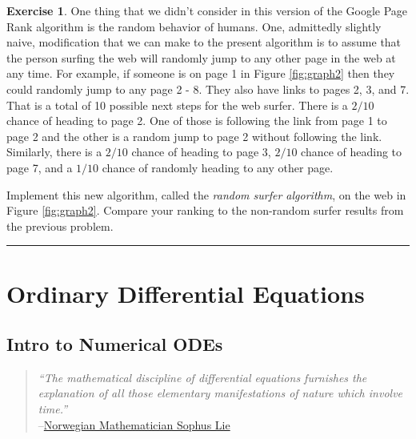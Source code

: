\documentclass[
]{book}
\theoremstyle{definition}
\theoremstyle{definition}
\theoremstyle{definition}
\newtheorem{exercise}{Exercise}[chapter]
\theoremstyle{remark}
\begin{document}
\begin{exercise}
\protect\hypertarget{exr:unnamed-chunk-408}{}{\label{exr:unnamed-chunk-408} }One thing that we didn't consider in this version of the Google Page
Rank algorithm is the random behavior of humans. One, admittedly
slightly naive, modification that we can make to the present algorithm
is to assume that the person surfing the web will randomly jump to any
other page in the web at any time. For example, if someone is on page 1
in Figure \ref{fig:graph2} then they could randomly jump to any page 2 - 8.
They also have links to pages 2, 3, and 7. That is a total of 10
possible next steps for the web surfer. There is a \(2/10\) chance of
heading to page 2. One of those is following the link from page 1 to
page 2 and the other is a random jump to page 2 without following the
link. Similarly, there is a \(2/10\) chance of heading to page 3, \(2/10\)
chance of heading to page 7, and a \(1/10\) chance of randomly heading to
any other page.

Implement this new algorithm, called the \emph{random surfer algorithm}, on
the web in Figure \ref{fig:graph2}. Compare your ranking to the non-random surfer
results from the previous problem.
\end{exercise}

\begin{center}\rule{0.5\linewidth}{0.5pt}\end{center}

\hypertarget{ch:odes}{%
\chapter{Ordinary Differential Equations}\label{ch:odes}}

\hypertarget{intro-to-numerical-odes}{%
\section{Intro to Numerical ODEs}\label{intro-to-numerical-odes}}

\begin{quote}
\emph{``The mathematical discipline of differential equations furnishes the
explanation of all those elementary manifestations of nature which
involve time.''}\\
--\href{https://en.wikipedia.org/wiki/Sophus_Lie}{Norwegian Mathematician Sophus
Lie}
\end{quote}
\end{document}
